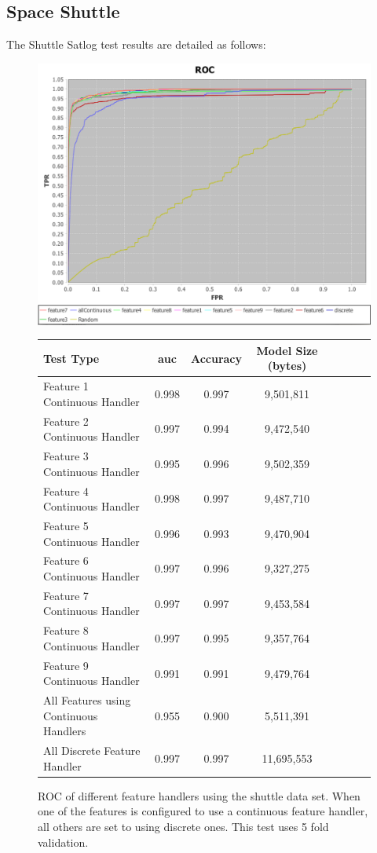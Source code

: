 \documentclass[a4paper,11pt]{scrreprt}
\begin{document}
\subsection{Space Shuttle}
The Shuttle Satlog test results are detailed as follows:
\begin{figure}[h!]
\centering
\caption{ROC of different feature handlers using the shuttle data set. When one of the features is configured to use a continuous feature handler, all others are set to using discrete ones. This test uses 5 fold validation.}
\includegraphics[scale=0.55, trim=0 -25 0 2, clip=true] {features_shuttle.png}
\label{fig:spaceshuttleresults}
\begin{tabular}{l*{6}{c}r}
Test Type & \acrshort{auc} & Accuracy & Model Size (bytes)\\
\hline
Feature 1 Continuous Handler & 0.998 & 0.997 & 9,501,811\\
Feature 2 Continuous Handler & 0.997 & 0.994 & 9,472,540\\
Feature 3 Continuous Handler & 0.995 & 0.996 & 9,502,359\\
Feature 4 Continuous Handler & 0.998 & 0.997 & 9,487,710\\
Feature 5 Continuous Handler & 0.996 & 0.993 & 9,470,904\\
Feature 6 Continuous Handler & 0.997 & 0.996 & 9,327,275\\
Feature 7 Continuous Handler & 0.997 & 0.997 & 9,453,584\\
Feature 8 Continuous Handler & 0.997 & 0.995 & 9,357,764\\
Feature 9 Continuous Handler & 0.991 & 0.991 & 9,479,764\\
All Features using Continuous Handlers & 0.955 & 0.900 & 5,511,391\\
All Discrete Feature Handler & 0.997 & 0.997 & 11,695,553
\end{tabular}
\end{figure}
\end{document}
